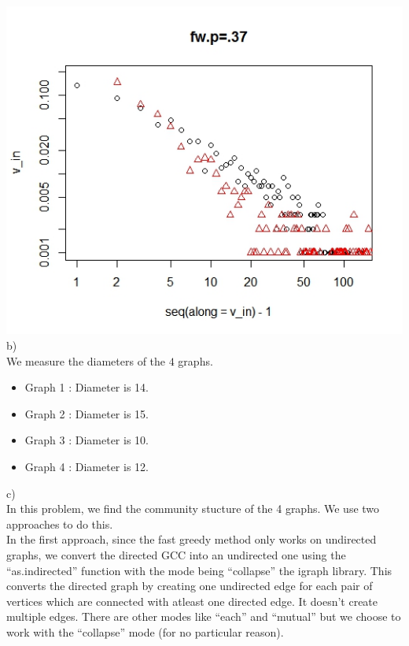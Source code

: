 \documentclass{article}
\begin{document}
\includegraphics[scale=0.4]{pd20} \\
b)\\
We measure the diameters of the $4$ graphs.\\
\begin{itemize}
 \item 
 Graph 1 : Diameter is 14.
 \item 
 Graph 2 : Diameter is 15.
 \item 
 Graph 3 : Diameter is 10.
 \item 
 Graph 4 : Diameter is 12.
\end{itemize}

c)\\
In this problem, we find the community stucture of the 4 graphs. We use two approaches to do this.\\

In the first approach, since the fast greedy method only works on undirected graphs, we convert
the directed GCC into an undirected one using the ``as.indirected'' function with the mode being ``collapse''
the igraph library. This converts the directed graph by creating one undirected edge for each pair of vertices which are 
connected with atleast one directed edge. It doesn't create multiple edges. There are other modes like ``each'' and ``mutual''
but we choose to work with the ``collapse'' mode (for no particular reason).\\
\end{document}

